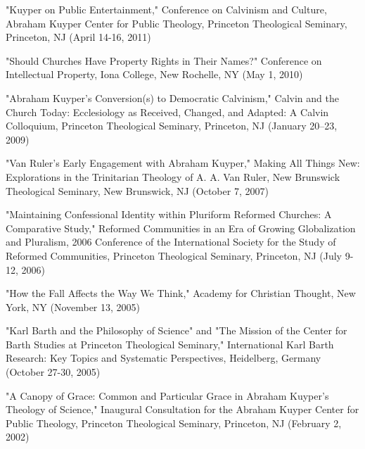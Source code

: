 \documentclass[10pt]{res} %
\begin{document}
\begin{resume}
\begin{hangparas}{.25in}{1}"Kuyper on Public Entertainment," Conference on Calvinism and Culture, Abraham Kuyper Center for Public Theology, Princeton Theological Seminary, Princeton, NJ (April 14-16, 2011)\end{hangparas}

\begin{hangparas}{.25in}{1}"Should Churches Have Property Rights in Their Names?" Conference on Intellectual Property, Iona College, New Rochelle, NY (May 1, 2010)\end{hangparas}

\begin{hangparas}{.25in}{1}"Abraham Kuyper’s Conversion(s) to Democratic Calvinism," Calvin and the Church Today: Ecclesiology as Received, Changed, and Adapted: A Calvin Colloquium, Princeton Theological Seminary, Princeton, NJ (January 20–23, 2009)\end{hangparas}

\begin{hangparas}{.25in}{1}"Van Ruler’s Early Engagement with Abraham Kuyper," Making All Things New: Explorations in the Trinitarian Theology of A. A. Van Ruler, New Brunswick Theological Seminary, New Brunswick, NJ (October 7, 2007)\end{hangparas}

\begin{hangparas}{.25in}{1}"Maintaining Confessional Identity within Pluriform Reformed Churches: A Comparative Study," Reformed Communities in an Era of Growing Globalization and Pluralism, 2006 Conference of the International Society for the Study of Reformed Communities, Princeton Theological Seminary, Princeton, NJ (July 9-12, 2006)\end{hangparas}

\begin{hangparas}{.25in}{1}"How the Fall Affects the Way We Think," Academy for Christian Thought, New York, NY (November 13, 2005)\end{hangparas}

\begin{hangparas}{.25in}{1}"Karl Barth and the Philosophy of Science" and "The Mission of the Center for Barth Studies at Princeton Theological Seminary," International Karl Barth Research: Key Topics and Systematic Perspectives, Heidelberg, Germany (October 27-30, 2005)\end{hangparas}

\begin{hangparas}{.25in}{1}"A Canopy of Grace: Common and Particular Grace in Abraham Kuyper’s Theology of Science," Inaugural Consultation for the Abraham Kuyper Center for Public Theology, Princeton Theological Seminary, Princeton, NJ (February 2, 2002)\end{hangparas}


\end{resume}
\end{document}
